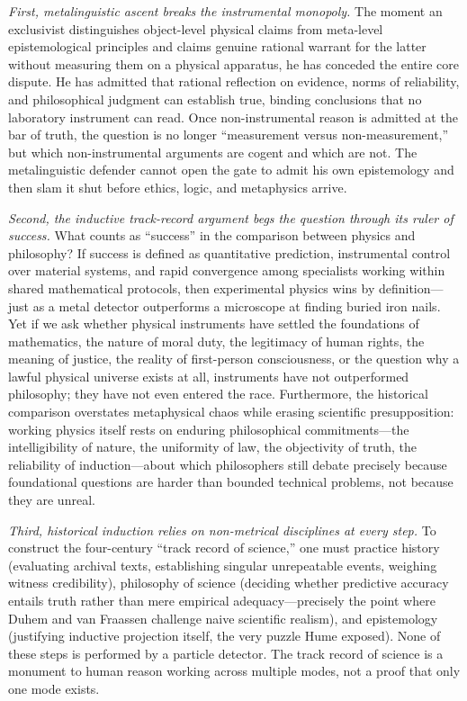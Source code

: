 \emph{First, metalinguistic ascent breaks the instrumental monopoly.} The moment an exclusivist distinguishes object-level physical claims from meta-level epistemological principles and claims genuine rational warrant for the latter without measuring them on a physical apparatus, he has conceded the entire core dispute. He has admitted that rational reflection on evidence, norms of reliability, and philosophical judgment can establish true, binding conclusions that no laboratory instrument can read. Once non-instrumental reason is admitted at the bar of truth, the question is no longer ``measurement versus non-measurement,'' but which non-instrumental arguments are cogent and which are not. The metalinguistic defender cannot open the gate to admit his own epistemology and then slam it shut before ethics, logic, and metaphysics arrive.

\emph{Second, the inductive track-record argument begs the question through its ruler of success.} What counts as ``success'' in the comparison between physics and philosophy? If success is defined as quantitative prediction, instrumental control over material systems, and rapid convergence among specialists working within shared mathematical protocols, then experimental physics wins by definition---just as a metal detector outperforms a microscope at finding buried iron nails. Yet if we ask whether physical instruments have settled the foundations of mathematics, the nature of moral duty, the legitimacy of human rights, the meaning of justice, the reality of first-person consciousness, or the question why a lawful physical universe exists at all, instruments have not outperformed philosophy; they have not even entered the race. Furthermore, the historical comparison overstates metaphysical chaos while erasing scientific presupposition: working physics itself rests on enduring philosophical commitments---the intelligibility of nature, the uniformity of law, the objectivity of truth, the reliability of induction---about which philosophers still debate precisely because foundational questions are harder than bounded technical problems, not because they are unreal.

\emph{Third, historical induction relies on non-metrical disciplines at every step.} To construct the four-century ``track record of science,'' one must practice history (evaluating archival texts, establishing singular unrepeatable events, weighing witness credibility), philosophy of science (deciding whether predictive accuracy entails truth rather than mere empirical adequacy---precisely the point where Duhem and van Fraassen challenge naive scientific realism), and epistemology (justifying inductive projection itself, the very puzzle Hume exposed). None of these steps is performed by a particle detector. The track record of science is a monument to human reason working across multiple modes, not a proof that only one mode exists.

